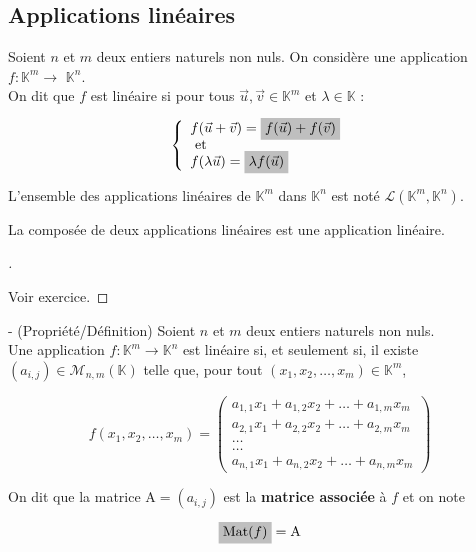 \documentclass[12pt]{article}
\newcommand{\hideM}[1]{\mbox{\vphantom{$#1$}\smash{\colorbox{gray!50}{$\displaystyle #1$}}} }
\theoremstyle{break}
\newenvironment{demo}[1][\proofname]{%
  \begin{proof}[#1]$ $\newline
}{%
  \end{proof}
}
\begin{document}
\subsection{Applications linéaires}
\begin{definition}{}{}
Soient $n$ et $m$ deux entiers naturels non nuls. On considère une application $f: \mathbb{K}^{m} \longrightarrow$ $\mathbb{K}^{n}$.\\
On dit que $f$ est linéaire si pour tous $\vec{u}, \vec{v} \in \mathbb{K}^{m}$ et $\lambda \in \mathbb{K}$ :

$$
\left\{\begin{array}{l}
f(\vec{u}+\vec{v})=\hideM{f(\vec{u})+f(\vec{v})} \\
\text { et } \\
f(\lambda \vec{u})=\hideM{\lambda f(\vec{u})}
\end{array}\right.
$$
\end{definition}

\begin{definition}{}{}
L'ensemble des applications linéaires de $\mathbb{K}^{m}$ dans $\mathbb{K}^{n}$ est noté $\mathcal{L}\left(\mathbb{K}^{m}, \mathbb{K}^{n}\right)$.
\end{definition}

\begin{proposition}{}{}
La composée de deux applications linéaires est une application linéaire.
\end{proposition}

\begin{demo}
Voir exercice.
\end{demo}

\begin{definition}{ - (Propriété/Définition)}{}
Soient $n$ et $m$ deux entiers naturels non nuls.\\
Une application $f: \mathbb{K}^{m} \longrightarrow \mathbb{K}^{n}$ est linéaire si, et seulement si, il existe $\left(a_{i, j}\right) \in \mathcal{M}_{n, m}(\mathbb{K})$ telle que, pour tout $\left(x_{1}, x_{2}, \ldots, x_{m}\right) \in \mathbb{K}^{m}$,

$$
f\left(x_{1}, x_{2}, \ldots, x_{m}\right)=\left(\begin{array}{c}
a_{1,1} x_{1}+a_{1,2} x_{2}+\ldots+a_{1, m} x_{m} \\
a_{2,1} x_{1}+a_{2,2} x_{2}+\ldots+a_{2, m} x_{m} \\
\ldots \\
\ldots \\
a_{n, 1} x_{1}+a_{n, 2} x_{2}+\ldots+a_{n, m} x_{m}
\end{array}\right)
$$

On dit que la matrice $\mathrm{A}=\left(a_{i, j}\right)$ est la \textbf{matrice associée} à $f$ et on note

$$
\hideM{\operatorname{Mat}(f)}=\mathrm{A}
$$
\end{definition}
\end{document}
